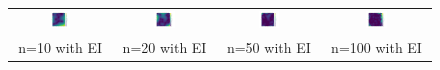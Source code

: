 \documentclass[11pt]{article}
\begin{document}
\begin{figure}[H]
    \centering
    \begin{tabular}{cccc}
        \includegraphics[width=0.225\textwidth]{../Task-02/plots/gp_std_rational_quadratic_n10_EI.png} &
        \includegraphics[width=0.225\textwidth]{../Task-02/plots/gp_std_rational_quadratic_n20_EI.png} &
        \includegraphics[width=0.225\textwidth]{../Task-02/plots/gp_std_rational_quadratic_n50_EI.png} &
        \includegraphics[width=0.225\textwidth]{../Task-02/plots/gp_std_rational_quadratic_n100_EI.png} \\
        n=10 with EI & n=20 with EI & n=50 with EI & n=100 with EI \\[0.5em]
        

\end{tabular}
\end{figure}
\end{document}
